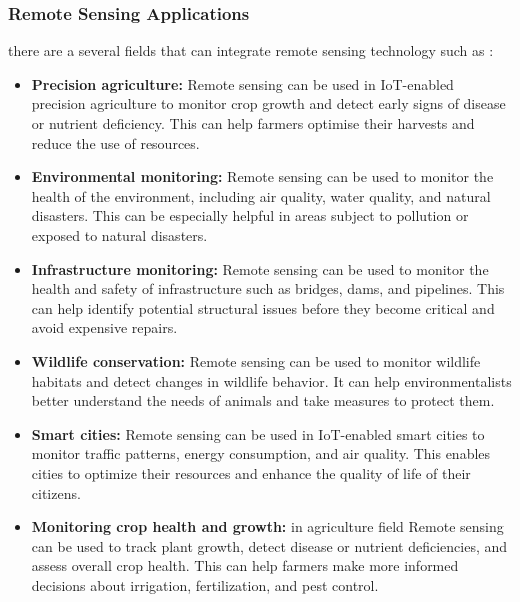\subsubsection{Remote Sensing Applications}
there are a several fields that can integrate remote sensing technology such as :
\begin{itemize}
	\item 	\textbf{Precision agriculture:} Remote sensing can be used in IoT-enabled precision agriculture to monitor crop growth and detect early signs of disease or nutrient deficiency. This can help farmers optimise their harvests and reduce the use of resources. 
	
	\item 	\textbf{Environmental monitoring:} Remote sensing can be used to monitor the health of the environment, including air quality, water quality, and natural disasters. This can be especially helpful in areas subject to pollution or exposed to natural disasters.
	
	\item 	\textbf{Infrastructure monitoring:} Remote sensing can be used to monitor the health and safety of infrastructure such as bridges, dams, and pipelines. This can help identify potential structural issues before they become critical and avoid expensive repairs.
	
	\item 	\textbf{Wildlife conservation:} Remote sensing can be used to monitor wildlife habitats and detect changes in wildlife behavior. It can help environmentalists better understand the needs of animals and take measures to protect them.
	
	\item 	\textbf{Smart cities:} Remote sensing can be used in IoT-enabled smart cities to monitor traffic patterns, energy consumption, and air quality. This enables cities to optimize their resources and enhance the quality of life of their citizens.
	
	\item \textbf{Monitoring crop health and growth:} in agriculture field Remote sensing can be used to track plant growth, detect disease or nutrient deficiencies, and assess overall crop health. This can help farmers make more informed decisions about irrigation, fertilization, and pest control. \cite{schulz2018machine}\cite{chong2017review}\cite{navalgund2007remote}\cite{karthikeyan2020review}
\end{itemize} 

